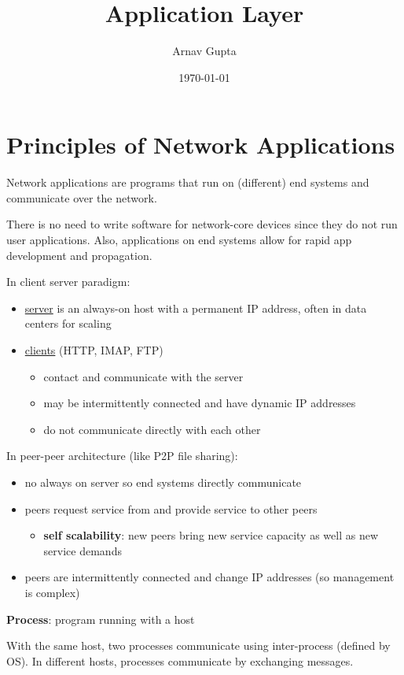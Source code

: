 \documentclass[11pt]{article}
\author{Arnav Gupta}
\date{\today}
\title{Application Layer}
\begin{document}
\maketitle
\tableofcontents

\section{Principles of Network Applications}
\label{sec:orgca531dd}
Network applications are programs that run on (different) end systems and communicate over the network.

There is no need to write software for network-core devices since they do not run user applications.
Also, applications on end systems allow for rapid app development and propagation.

In client server paradigm:
\begin{itemize}
\item \uline{server} is an always-on host with a permanent IP address, often in data centers for scaling
\item \uline{clients} (HTTP, IMAP, FTP)
\begin{itemize}
\item contact and communicate with the server
\item may be intermittently connected and have dynamic IP addresses
\item do not communicate directly with each other
\end{itemize}
\end{itemize}

In peer-peer architecture (like P2P file sharing):
\begin{itemize}
\item no always on server so end systems directly communicate
\item peers request service from and provide service to other peers
\begin{itemize}
\item \textbf{self scalability}: new peers bring new service capacity as well as new service demands
\end{itemize}
\item peers are intermittently connected and change IP addresses (so management is complex)
\end{itemize}

\textbf{Process}: program running with a host

With the same host, two processes communicate using inter-process (defined by OS).
In different hosts, processes communicate by exchanging messages.
\end{document}
